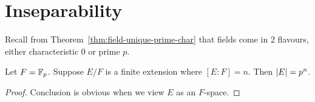 
    


\section{Inseparability}

\begin{remark}
    Recall from Theorem~\ref{thm:field-unique-prime-char}
    that fields come in 2 flavours,
    either characteristic 0 or prime \(p\).
\end{remark}

\begin{proposition}\label{prop:finite-extension-finite-field}
    Let \(F = \mathbb{F}_p\).
    Suppose \(E/F\) is a finite extension where \([E:F] = n\).
    Then \(\abs{E} = p^n\).
\end{proposition}
\begin{proof}
    Conclusion is obvious when we view \(E\) as an \(F\)-space.
\end{proof}

